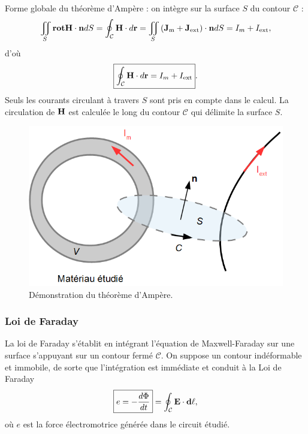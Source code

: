 \documentclass[11pt,a4paper]{report}
\begin{document}
Forme globale du théorème d'Ampère : on intègre sur la surface $S$ du contour $\mathcal{C}$ :
\begin{equation}
	\iint_S \textbf{rot}\bold{H}\cdot\bold{n}dS = \oint_\mathcal{C} \bold{H}\cdot d\bold{r} = \iint_S \left(\bold{J}_\text{m}+\bold{J}_\text{ext}\right)\cdot\bold{n}dS = I_m + I_\text{ext},
\end{equation}
d'où
\begin{equation}
	\boxed{\oint_\mathcal{C} \bold{H}\cdot d\bold{r} = I_m + I_\text{ext}}.
\end{equation}
Seuls les courants circulant à travers $S$ sont pris en compte dans le calcul. La circulation de $\bold{H}$ est calculée le long du contour $\mathcal{C}$ qui délimite la surface $S$.

\begin{figure}[h!]
\begin{center}
	\includegraphics[scale = 0.30]{ampere_theo.png}
	\caption{Démonstration du théorème d'Ampère.} 
	\label{fig:ampere_theo}
\end{center}
\end{figure}

\subsubsection{Loi de Faraday}

La loi de Faraday s'établit en intégrant l'équation de Maxwell-Faraday sur une surface s'appuyant sur un contour fermé $\mathcal{C}$. On suppose un contour indéformable et immobile, de sorte que l'intégration est immédiate et conduit à la Loi de Faraday
\begin{equation}
	\boxed{e = - \frac{d\Phi}{dt}} = \oint_\mathcal{C} \bold{E}\cdot\bold{d\ell},
\end{equation}
où $e$ est la force électromotrice générée dans le circuit étudié.
\end{document}
